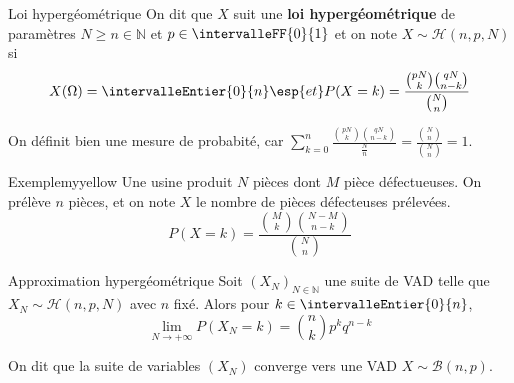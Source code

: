    \begin{defi}{Loi hypergéométrique}{}
        On dit que $X$ suit une \textbf{loi hypergéométrique} de paramètres $N \geq n \in \mathbb{N}$ et $p \in \intervalleFF{0}{1}$ et on note $X \sim \mathcal{H}(n,p,N)$ si 
        \[ X(\Omega) = \intervalleEntier{0}{n} \esp{et} P(X=k) = \frac{\binom{pN}{k} \binom{qN}{n-k}}{\binom{N}{n}} \]   
    \end{defi}

    On définit bien une mesure de probabité, car $\sum_{k = 0}^n \frac{\binom{pN}{k} \binom{qN}{n-k}}{\frac{N}{n}} = \frac{\binom{N}{n}}{\binom{N}{n}} = 1$.

    \begin{omed}{Exemple}{myyellow}
        Une usine produit $N$ pièces dont $M$ pièce défectueuses. On prélève $n$ pièces, et on note $X$ le nombre de pièces défecteuses prélevées. 
        \[ P(X = k) = \frac{\binom{M}{k} \binom{N-M}{n-k}}{\binom{N}{n}} \]    
    \end{omed}

    \begin{prop}{Approximation hypergéométrique}{}
        Soit $(X_N)_{N \in \mathbb{N}}$ une suite de VAD telle que $X_N \sim \mathcal{H}(n, p, N)$ avec $n$ fixé. Alors pour $k \in \intervalleEntier{0}{n}$, 
        \[ \lim_{N \to +\infty} P(X_N = k) = \binom{n}{k} p^k q^{n-k} \]   
    \end{prop}

    On dit que la suite de variables $(X_N)$ converge vers une VAD $X \sim \mathcal{B}(n,p)$.

